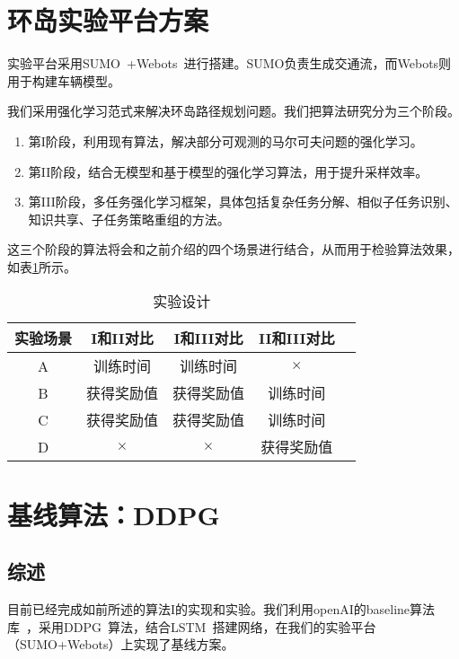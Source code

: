 \section{环岛实验平台方案}
    实验平台采用SUMO~\cite{SUMO}+Webots~\cite{Webots}进行搭建。SUMO负责生成交通流，而Webots则用于构建车辆模型。\par
    我们采用强化学习范式来解决环岛路径规划问题。我们把算法研究分为三个阶段。
    \begin{enumerate}
      \item 第I阶段，利用现有算法，解决部分可观测的马尔可夫问题的强化学习。
      \item 第II阶段，结合无模型和基于模型的强化学习算法，用于提升采样效率。
      \item 第III阶段，多任务强化学习框架，具体包括复杂任务分解、相似子任务识别、知识共享、子任务策略重组的方法。
    \end{enumerate}
    \par 这三个阶段的算法将会和之前介绍的四个场景进行结合，从而用于检验算法效果，如表\ref{table:experiments}所示。
    \begin{table}[h!]
    \centering
    \caption{实验设计}
    \label{table:experiments}
    \begin{tabular}[c]{|c|c|c|c|c|}
    \hline
    \textbf{实验场景} & \textbf{I和II对比} & \textbf{I和III对比} & \textbf{II和III对比}\\
    \hline \hline
    A   & 训练时间 & 训练时间 & $\times$ \\ \hline
    B   & 获得奖励值 & 获得奖励值 & 训练时间 \\ \hline
    C   & 获得奖励值 & 获得奖励值 & 训练时间 \\ \hline
    D   & $\times$ & $\times$ & 获得奖励值 \\
    \hline
    \end{tabular}
    \end{table}

\section{基线算法：DDPG}
  \subsection{综述}
  目前已经完成如前所述的算法I的实现和实验。我们利用openAI的baseline算法库~\cite{openAI_baselines}，采用DDPG~\cite{DDPG}算法，结合LSTM~\cite{DRQ}搭建网络，在我们的实验平台（SUMO+Webots）上实现了基线方案。\par
  
